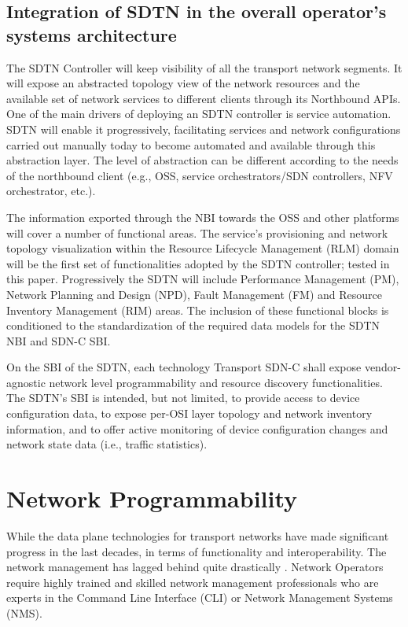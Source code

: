 \documentclass[a4paper,fleqn]{cas-dc}
\begin{document}
\subsection{Integration of SDTN in the overall operator’s systems architecture}
\label{section:sdtn}
The SDTN Controller will keep visibility of all the transport network segments. It will expose an abstracted topology view of the network resources and the available set of network services to different clients through its Northbound APIs.  
One of the main drivers of deploying an SDTN controller is service automation. SDTN will enable it progressively, facilitating services and network configurations carried out manually today to become automated and available through this abstraction layer.  The level of abstraction can be different according to the needs of the northbound client (e.g., OSS, service orchestrators/SDN controllers, NFV orchestrator, etc.). 

The information exported through the NBI towards the OSS and other platforms will cover a number of functional areas. The service’s provisioning and network topology visualization within the Resource Lifecycle Management (RLM) domain will be the first set of functionalities adopted by the SDTN controller; tested in this paper. Progressively the SDTN will include Performance Management (PM), Network Planning and Design (NPD), Fault Management (FM) and Resource Inventory Management (RIM) areas. The inclusion of these functional blocks is conditioned to the standardization of the required data models for the SDTN NBI and SDN-C SBI.

On the SBI of the SDTN, each technology Transport SDN-C shall expose vendor-agnostic network level programmability and resource discovery functionalities. The SDTN's SBI is intended, but not limited, to provide access to device configuration data, to expose per-OSI layer topology and network inventory information, and to offer active monitoring of device configuration changes and network state data (i.e., traffic statistics). 

\section{Network Programmability}
\label{section:net}

While the data plane technologies for transport networks have made significant progress in the last decades, in terms of functionality and interoperability. The network management has lagged behind quite drastically \cite{claise2019network,edelman2018network}. Network Operators require highly trained and skilled network management professionals who are experts in the Command Line Interface (CLI) or Network Management Systems (NMS). 
\end{document}
